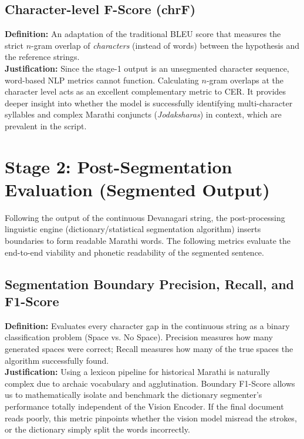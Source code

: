 \documentclass[journal, onecolumn]{IEEEtran}
\begin{document}
\subsection{Character-level F-Score (chrF)}
\textbf{Definition:} An adaptation of the traditional BLEU score that measures the strict $n$-gram overlap of \textit{characters} (instead of words) between the hypothesis and the reference strings.
\\[5pt]
\textbf{Justification:} Since the stage-1 output is an unsegmented character sequence, word-based NLP metrics cannot function. Calculating $n$-gram overlaps at the character level acts as an excellent complementary metric to CER. It provides deeper insight into whether the model is successfully identifying multi-character syllables and complex Marathi conjuncts (\textit{Jodaksharas}) in context, which are prevalent in the script.

\section{Stage 2: Post-Segmentation Evaluation (Segmented Output)}
Following the output of the continuous Devanagari string, the post-processing linguistic engine (dictionary/statistical segmentation algorithm) inserts boundaries to form readable Marathi words. The following metrics evaluate the end-to-end viability and phonetic readability of the segmented sentence.

\subsection{Segmentation Boundary Precision, Recall, and F1-Score}
\textbf{Definition:} Evaluates every character gap in the continuous string as a binary classification problem (Space vs. No Space). Precision measures how many generated spaces were correct; Recall measures how many of the true spaces the algorithm successfully found.
\\[5pt]
\textbf{Justification:} Using a lexicon pipeline for historical Marathi is naturally complex due to archaic vocabulary and agglutination. Boundary F1-Score allows us to mathematically isolate and benchmark the dictionary segmenter's performance totally independent of the Vision Encoder. If the final document reads poorly, this metric pinpoints whether the vision model misread the strokes, or the dictionary simply split the words incorrectly.
\end{document}
